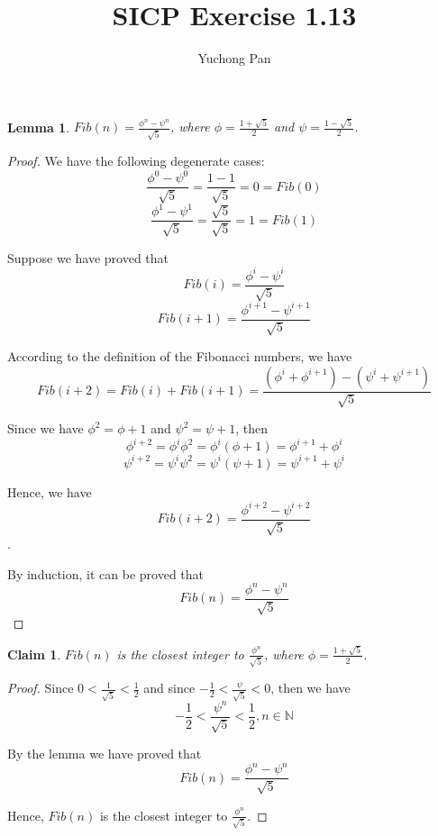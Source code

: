 \documentclass[11pt, oneside]{article}
\title{SICP Exercise 1.13}
\author{Yuchong Pan}
\begin{document}
\maketitle

\theoremstyle{nonumberplain}

\newtheorem{claim}{Claim}
\newtheorem{lemma}{Lemma}
\newtheorem{proof}{Proof}

\begin{lemma}
    $Fib(n) = \frac{\phi^n-\psi^n}{\sqrt{5}}$, where $\phi = \frac{1+\sqrt{5}}{2}$ and $\psi = \frac{1-\sqrt{5}}{2}$.
\end{lemma}

\begin{proof}
    We have the following degenerate cases:
    $$\frac{\phi^0-\psi^0}{\sqrt{5}} = \frac{1-1}{\sqrt{5}} = 0 = Fib(0)$$
    $$\frac{\phi^1-\psi^1}{\sqrt{5}} = \frac{\sqrt{5}}{\sqrt{5}} = 1 = Fib(1)$$

    Suppose we have proved that
    $$Fib(i) = \frac{\phi^i-\psi^i}{\sqrt{5}}$$
    $$Fib(i+1) = \frac{\phi^{i+1}-\psi^{i+1}}{\sqrt{5}}$$

    According to the definition of the Fibonacci numbers, we have
    $$Fib(i+2) = Fib(i)+Fib(i+1) = \frac{\left(\phi^i+\phi^{i+1}\right)-\left(\psi^i+\psi^{i+1}\right)}{\sqrt{5}}$$

    Since we have $\phi^2 = \phi+1$ and $\psi^2 = \psi+1$, then
    $$\phi^{i+2} = \phi^i\phi^2=\phi^i(\phi+1)=\phi^{i+1}+\phi^i$$
    $$\psi^{i+2} = \psi^i\psi^2=\psi^i(\psi+1)=\psi^{i+1}+\psi^i$$

    Hence, we have
    $$Fib(i+2) = \frac{\phi^{i+2} - \psi^{i+2}}{\sqrt{5}}$$.

    By induction, it can be proved that
    $$Fib(n) = \frac{\phi^n-\psi^n}{\sqrt{5}}$$
\end{proof}

\begin{claim}
    $Fib(n)$ is the closest integer to $\frac{\phi^n}{\sqrt{5}}$, where $\phi = \frac{1+\sqrt{5}}{2}$.
\end{claim}

\begin{proof}
    Since $0 < \frac{1}{\sqrt{5}} < \frac{1}{2}$ and since $-\frac{1}{2} < \frac{\psi}{\sqrt{5}} < 0$, then we have
    $$-\frac{1}{2} < \frac{\psi^n}{\sqrt{5}} < \frac{1}{2}, n \in \mathbb{N}$$

    By the lemma we have proved that
    $$Fib(n) = \frac{\phi^n-\psi^n}{\sqrt{5}}$$

    Hence, $Fib(n)$ is the closest integer to $\frac{\phi^n}{\sqrt{5}}$.
\end{proof}
\end{document}
